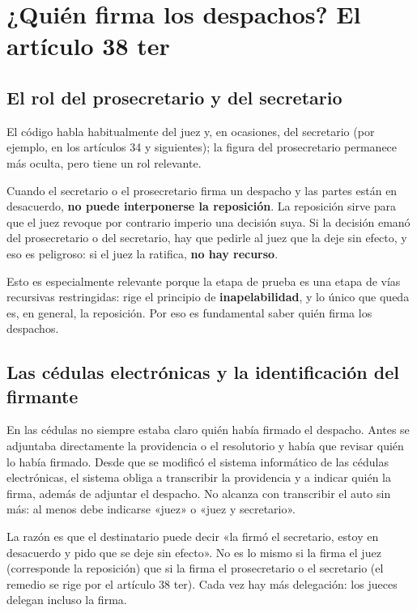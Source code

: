 \documentclass[12pt,oneside]{book}
\begin{document}
\section{¿Quién firma los despachos? El artículo 38 ter}

\subsection{El rol del prosecretario y del secretario}

El código habla habitualmente del juez y, en ocasiones, del secretario (por ejemplo, en los artículos 34 y siguientes); la figura del prosecretario permanece más oculta, pero tiene un rol relevante.

Cuando el secretario o el prosecretario firma un despacho y las partes están en desacuerdo, \textbf{no puede interponerse la reposición}. La reposición sirve para que el juez revoque por contrario imperio una decisión suya. Si la decisión emanó del prosecretario o del secretario, hay que pedirle al juez que la deje sin efecto, y eso es peligroso: si el juez la ratifica, \textbf{no hay recurso}.

Esto es especialmente relevante porque la etapa de prueba es una etapa de vías recursivas restringidas: rige el principio de \textbf{inapelabilidad}, y lo único que queda es, en general, la reposición. Por eso es fundamental saber quién firma los despachos.

\subsection{Las cédulas electrónicas y la identificación del firmante}

En las cédulas no siempre estaba claro quién había firmado el despacho. Antes se adjuntaba directamente la providencia o el resolutorio y había que revisar quién lo había firmado. Desde que se modificó el sistema informático de las cédulas electrónicas, el sistema obliga a transcribir la providencia y a indicar quién la firma, además de adjuntar el despacho. No alcanza con transcribir el auto sin más: al menos debe indicarse «juez» o «juez y secretario».

La razón es que el destinatario puede decir «la firmó el secretario, estoy en desacuerdo y pido que se deje sin efecto». No es lo mismo si la firma el juez (corresponde la reposición) que si la firma el prosecretario o el secretario (el remedio se rige por el artículo 38 ter). Cada vez hay más delegación: los jueces delegan incluso la firma.
\end{document}
